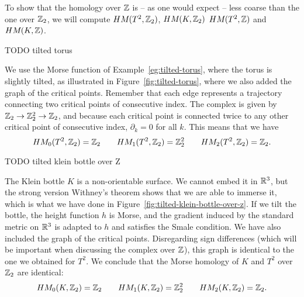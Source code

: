     To show that the homology over $\Z$ is -- as one would expect -- less coarse than the one over $\Z_2$, we will compute $\HMf{T^2, \Z_2}$, $\HMf{K, \Z_2}$
    $\HMf{T^2, \Z}$ and $\HMf{K, \Z}$.



\begin{eg}
    \begin{marginfigure}
        \centering
        \caption{TODO tilted torus}
        \label{fig:tilted-torus}
    \end{marginfigure}
    We use the Morse function of Example~\ref{eg:tilted-torus}, where the torus is slightly tilted, as illustrated in Figure~\ref{fig:tilted-torus}, where we also added the graph of the critical points.
    Remember that each edge represents a trajectory connecting two critical points of consecutive index.
    The complex is given by $ \Z_2 \to  \Z_2^2 \to \Z_2$, and because each critical point is connected twice to any other critical point of consecutive index, $\partial_k = 0$ for all $k$. 
    This means that we have
    \[
        \HMf[0]{T^2, \Z_2} = \Z_2 \qquad
        \HMf[1]{T^2, \Z_2} = \Z_2^2 \qquad
        \HMf[2]{T^2, \Z_2} = \Z_2
    .\] 
\end{eg}
\begin{eg}
    \begin{marginfigure}
        \centering
        \caption{TODO tilted klein bottle over Z}
        \label{fig:tilted-klein-bottle-over-z}
    \end{marginfigure}
    The Klein bottle $K$ is a non-orientable surface. We cannot embed it in $\R^3$, but the strong version Withney's theorem shows that we are able to immerse it, which is what we have done in Figure~\ref{fig:tilted-klein-bottle-over-z}.
    If we tilt the bottle, the height function $h$ is Morse, and the gradient induced by the standard metric on $\R^3$ is adapted to $h$ and satisfies the Smale condition.
    We have also included the graph of the critical points.
    Disregarding sign differences (which will be important when discussing the complex over $\Z$), this graph is identical to the one we obtained for $T^2$. We conclude that the Morse homology of $K$ and  $T^2$ over $\Z_2$ are identical:
    \[
        \HMf[0]{K, \Z_2} = \Z_2 \qquad
        \HMf[1]{K, \Z_2} = \Z_2^2 \qquad
        \HMf[2]{K, \Z_2} = \Z_2
    .\] 
\end{eg}

